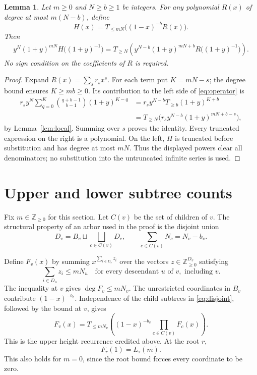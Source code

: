 \documentclass[11pt]{article}
\newtheorem{lemma}[theorem]{Lemma}
\newcommand{\N}{\mathbb Z_{\geq0}}
\begin{document}
\begin{lemma}\label{lem:operator}
Let $m\geq0$ and $N\geq b\geq1$ be integers. For any polynomial $R(x)$
of degree at most $m(N-b)$, define
\[
 H(x)=T_{\leq mN}\bigl((1-x)^{-b}R(x)\bigr).
\]
Then
\begin{equation}\label{eq:operator}
 \begin{split}
 y^N(1+y)^{mN}H\bigl((1+y)^{-1}\bigr)
   =T_{\geq N}\!\left(
       y^{N-b}(1+y)^{mN+b}R\bigl((1+y)^{-1}\bigr)\right).
 \end{split}
\end{equation}
No sign condition on the coefficients of $R$ is required.
\end{lemma}

\begin{proof}
Expand $R(x)=\sum_s r_s x^s$. For each term put $K=mN-s$; the degree
bound ensures $K\geq mb\geq0$. Its contribution to the left side of
\eqref{eq:operator} is
\begin{align*}
 r_s y^N\sum_{q=0}^{K}\binom{q+b-1}{b-1}(1+y)^{K-q}
   &=r_s y^{N-b}T_{\geq b}(1+y)^{K+b}\\
   &=T_{\geq N}\bigl(r_s y^{N-b}(1+y)^{mN+b-s}\bigr),
\end{align*}
by Lemma~\ref{lem:local}. Summing over $s$ proves the identity.
Every truncated expression on the right is a polynomial. On the left,
$H$ is truncated before substitution and has degree at most $mN$.
Thus the displayed powers clear all denominators; no substitution into
the untruncated infinite series is used.
\end{proof}

\section{Upper and lower subtree counts}\label{sec:subtrees}

Fix $m\in\N$ for this section. Let $C(v)$ be the set of children of $v$.
The structural property of an arbor used in the proof is the disjoint union
\begin{equation}\label{eq:disjoint}
 D_v=B_v\sqcup\bigsqcup_{c\in C(v)}D_c,
 \qquad \sum_{c\in C(v)}N_c=N_v-b_v.
\end{equation}

Define $F_v(x)$ by summing $x^{\sum_{i\in D_v}z_i}$ over the vectors
$z\in\N^{D_v}$ satisfying
\[
 \sum_{i\in D_u}z_i\leq mN_u
 \quad\text{for every descendant }u\text{ of }v,\text{ including }v.
\]
The inequality at $v$ gives $\deg F_v\leq mN_v$. The unrestricted
coordinates in $B_v$ contribute $(1-x)^{-b_v}$. Independence of the child
subtrees in \eqref{eq:disjoint}, followed by the bound at $v$, gives
\begin{equation}\label{eq:F}
 F_v(x)=T_{\leq mN_v}\!\left((1-x)^{-b_v}
                                 \prod_{c\in C(v)}F_c(x)\right).
\end{equation}
This is the upper height recurrence credited above. At the root $r$,
\begin{equation}\label{eq:rootF}
 F_r(1)=L_\tau(m).
\end{equation}
This also holds for $m=0$, since the root bound forces every coordinate
to be zero.
\end{document}
